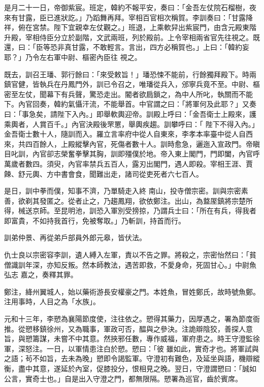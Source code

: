 \begin{pinyinscope}
 是月二十一日，帝御紫宸。班定，韓約不報平安，奏曰：「金吾左仗院石榴樹，夜來有甘露，臣已進狀訖。」乃蹈舞再拜。宰相百官相次稱賀。李訓奏曰：「甘露降祥，俯在宮禁。陛下宜親幸左仗觀之。」班退，上乘軟舁出紫宸門，由含元殿東階升殿，宰相侍臣分立於副階，文武兩班，列於殿前。上令宰相兩省官先往視之。既還，曰：「臣等恐非真甘露，不敢輕言。言出，四方必稱賀也。」上曰：「韓約妄耶？」乃令左右軍中尉、樞密內臣往
 視之。



 既去，訓召王璠、郭行餘曰：「來受敕旨！」璠恐悚不能前，行餘獨拜殿下。時兩鎮官健，皆執兵在丹鳳門外，訓已令召之，唯璠從兵入，邠寧兵竟不至。中尉、樞密至左仗，聞幕下有兵聲，驚恐走出。閽者欲扃鎖之，為中人所叱，執關而不能下。內官回奏，韓約氣懾汗流，不能舉首。中官謂之曰：「將軍何及此耶？」又奏曰：「事急矣，請陛下入內。」即舉軟輿迎帝。訓殿上呼曰：「金吾衛士上殿來，護乘輿者，人賞百千。」內官決殿後罘罳，舉輿疾趨。訓攀呼曰：「
 陛下不得入內。」金吾衛士數十人，隨訓而入。羅立言率府中從人自東來，李孝本率臺中從人自西來，共四百餘人，上殿縱擊內官，死傷者數十人。訓時愈急，邐迤入宣政門。帝瞋目叱訓，內官卻志榮奮拳擊其胸，訓即殭僕於地。帝入東上閣門，門即闔，內官呼萬歲者數四。須臾，內官率禁兵五百人，露刃出閣門，遇人即殺。宰相王涯、賈餗、舒元輿、方中書會食，聞難出走，諸司從吏死者六七百人。



 是日，訓中拳而僕，知事不濟，乃單騎走入終
 南山，投寺僧宗密。訓與宗密素善，欲剃其發匿之。從者止之，乃趨鳳翔，欲依鄭注。出山，為盩厔鎮將宗楚所得，械送京師。至昆明池，訓恐入軍別受搒掠，乃謂兵士曰：「所在有兵，得我者即富貴，不如持我首行，免被奪取。」乃斬訓，持首而行。



 訓弟仲景、再從弟戶部員外郎元皋，皆伏法。



 仇士良以宗密容李訓，遺人縛入左軍，責以不告之罪。將殺之，宗密怡然曰：「貧僧識訓年深，亦知反叛。然本師教法，遇苦即救，不愛身命，死固甘心。」中尉魚弘志
 嘉之，奏釋其罪。



 鄭注，絳州翼城人，始以藥術游長安權豪之門。本姓魚，冒姓鄭氏，故時號魚鄭。注用事時，人目之為「水族」。



 元和十三年，李愬為襄陽節度使，注往依之。愬得其藥力，因厚遇之，署為節度衙推。從愬移鎮徐州，又為職事，軍政可否，醖與之參決。注詭辯陰狡，善探人意旨，與愬籌謀，未嘗不中其意。然挾邪任數，專作威福，軍府患之。時王守澄監徐軍，深怒注。一日，以軍情患注白於愬。愬曰：「彼
 雖如此，實奇才也。將軍試與之語；茍不如旨，去未為晚」愬即令謁監軍。守澄初有難色，及延坐與語，機辯縱衡，盡中其意，遂延於內室，促膝投分，恨相見之晚。翌日，守澄謂愬曰：「誠如公言，實奇士也。」自是出入守澄之門，都無限隔。愬署為巡官，齒於賓席。




\end{pinyinscope}
